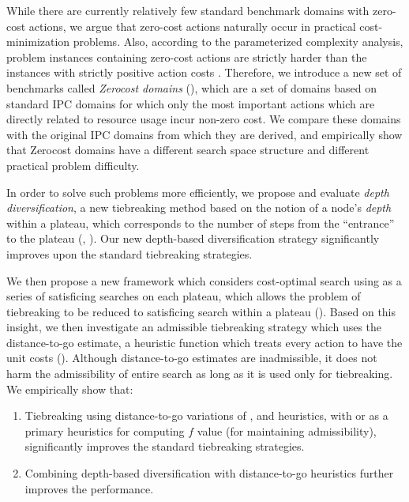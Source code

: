 While there are currently relatively few standard benchmark domains with zero-cost actions,
we argue that zero-cost actions naturally occur in
practical cost-minimization problems.
Also, according to the parameterized complexity analysis, problem instances containing zero-cost actions are strictly harder than the instances with strictly positive action costs \cite{aghighi2015}.
Therefore, we introduce a new set of benchmarks called \emph{Zerocost domains}
(), which are a set of domains based on standard IPC domains for which only the most important actions which are directly related to resource usage incur non-zero cost.
We compare these domains with the original IPC domains from which they are derived, and empirically show that 
Zerocost domains have a different search space structure and different practical problem difficulty.

In order to solve such problems more efficiently, we propose and
evaluate \emph{depth diversification}, a new
tiebreaking method based on the notion of a node's \emph{depth} within a plateau,
which corresponds to the number of steps from the ``entrance'' to
the plateau (,
). 
Our new depth-based diversification strategy significantly improves upon the 
standard tiebreaking strategies.

We then propose a new framework which considers cost-optimal search using \astar 
as a series of satisficing searches on each plateau,
which allows the problem of tiebreaking to be reduced to satisficing search within a plateau ().
Based on this insight, we then investigate an
admissible tiebreaking strategy which uses the distance-to-go estimate, a heuristic function which treats every action
to have the unit costs ().
Although distance-to-go estimates are inadmissible,
it does not harm the admissibility of entire search as long as it is used only for tiebreaking.
% 
We empirically show that:
\begin{enumerate}
 \item Tiebreaking using distance-to-go variations of \lmcut, \mands and \ff heuristics,
       with \lmcut or \mands as a primary heuristics for computing $f$ value (for maintaining admissibility),
       significantly improves the standard tiebreaking strategies.
 \item Combining depth-based diversification with distance-to-go heuristics 
       further improves the performance.
\end{enumerate}

